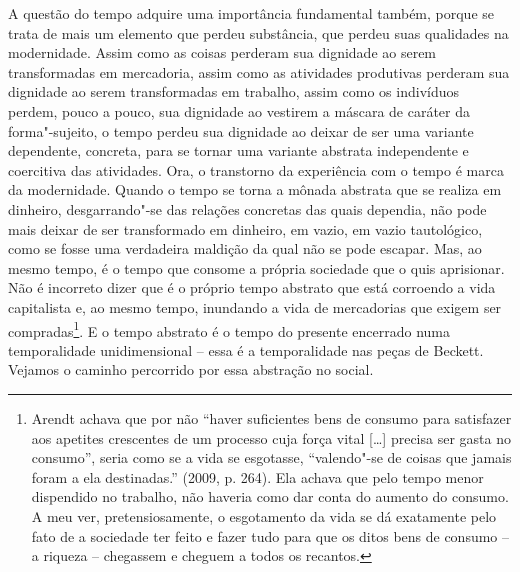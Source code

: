 A questão do tempo adquire uma importância fundamental também, porque se
trata de mais um elemento que perdeu substância, que perdeu suas
qualidades na modernidade. Assim como as coisas perderam sua dignidade
ao serem transformadas em mercadoria, assim como as atividades
produtivas perderam sua dignidade ao serem transformadas em trabalho,
assim como os indivíduos perdem, pouco a pouco, sua dignidade ao
vestirem a máscara de caráter da forma"-sujeito, o tempo perdeu sua
dignidade ao deixar de ser uma variante dependente, concreta, para se
tornar uma variante abstrata independente e coercitiva das atividades.
Ora, o transtorno da experiência com o tempo é marca da modernidade.
Quando o tempo se torna a mônada abstrata que se realiza em dinheiro,
desgarrando"-se das relações concretas das quais dependia, não pode mais
deixar de ser transformado em dinheiro, em vazio, em vazio tautológico,
como se fosse uma verdadeira maldição da qual não se pode escapar. Mas,
ao mesmo tempo, é o tempo que consome a própria sociedade que o quis
aprisionar. Não é incorreto dizer que é o próprio tempo abstrato que
está corroendo a vida capitalista e, ao mesmo tempo, inundando a vida de
mercadorias que exigem ser compradas\footnote{Arendt achava que por não
  ``haver suficientes bens de consumo para satisfazer aos apetites
  crescentes de um processo cuja força vital [\ldots{}] precisa ser gasta
  no consumo'', seria como se a vida se esgotasse, ``valendo"-se de
  coisas que jamais foram a ela destinadas.'' (2009, p. 264). Ela achava
  que pelo tempo menor dispendido no trabalho, não haveria como dar
  conta do aumento do consumo. A meu ver, pretensiosamente, o esgotamento
  da vida se dá exatamente pelo fato de a sociedade ter feito e fazer
  tudo para que os ditos bens de consumo -- a riqueza -- chegassem e
  cheguem a todos os recantos.}. E o tempo abstrato é o tempo do
presente encerrado numa temporalidade unidimensional -- essa é a
temporalidade nas peças de Beckett. Vejamos o caminho percorrido por
essa abstração no social.

